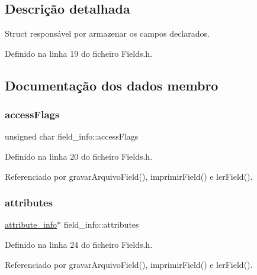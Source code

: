 \subsection{Descrição detalhada}
Struct responsável por armazenar os campos declarados. 

Definido na linha 19 do ficheiro Fields.\+h.



\subsection{Documentação dos dados membro}
\mbox{\label{structfield__info_a52647ac149308d5ef9f010689400ee4c}} 
\subsubsection{\texorpdfstring{access\+Flags}{accessFlags}}
{\footnotesize\ttfamily unsigned char field\+\_\+info\+::access\+Flags}



Definido na linha 20 do ficheiro Fields.\+h.



Referenciado por gravar\+Arquivo\+Field(), imprimir\+Field() e ler\+Field().

\mbox{\label{structfield__info_afdda114944ae5eaae78c237f99257108}} 
\subsubsection{\texorpdfstring{attributes}{attributes}}
{\footnotesize\ttfamily \hyperlink{structattribute__info}{attribute\+\_\+info}$\ast$ field\+\_\+info\+::attributes}



Definido na linha 24 do ficheiro Fields.\+h.



Referenciado por gravar\+Arquivo\+Field(), imprimir\+Field() e ler\+Field().

\mbox{\label{structfield__info_a89ea1703d384244c336899c3b04850f9}} 
